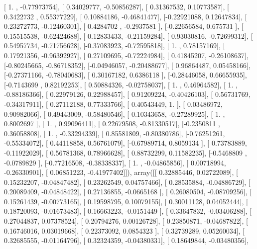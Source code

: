 \documentclass{article}
\begin{document}
       [ 1.        , -0.77973754],
       [ 0.34029777, -0.50856287],
       [ 0.31367532,  0.10773587],
       [ 0.3422732 ,  0.55377229],
       [ 0.10884186, -0.46841477],
       [-0.22921088,  0.12647834],
       [ 0.23272773, -0.12460301],
       [ 0.4284702 , -0.2937581 ],
       [-0.22656584,  0.675731  ],
       [ 0.15515538, -0.62424688],
       [ 0.12833433, -0.21159284],
       [ 0.93030816, -0.72699312],
       [ 0.54957734, -0.71756628],
       [-0.37083923, -0.72595818],
       [ 1.        ,  0.78157169],
       [ 0.17921356, -0.96392927],
       [ 0.27109695, -0.72224984],
       [ 0.41845207, -0.26108637],
       [-0.80245665, -0.86718352],
       [-0.04946057, -0.20488677],
       [ 0.96864487,  0.05458166],
       [-0.27371166, -0.78040683],
       [ 0.30167182,  0.6386118 ],
       [-0.28446058,  0.66655935],
       [-0.7143699 ,  0.82192253],
       [ 0.50884326, -0.02758037],
       [ 1.        ,  0.46964582],
       [ 1.        , -0.88186366],
       [ 0.22979126,  0.22988457],
       [ 0.91209224, -0.40426103],
       [ 0.56731769, -0.34317911],
       [ 0.27112188,  0.77333766],
       [ 0.40543449,  1.        ],
       [ 0.03486972,  0.90982066],
       [ 0.49443009, -0.58480546],
       [ 0.10343658, -0.27289925],
       [ 1.        ,  0.8002697 ],
       [ 1.        ,  0.99096411],
       [ 0.22679508, -0.81330517],
       [-0.2350811 ,  0.36058808],
       [ 1.        , -0.33294339],
       [ 0.85581809, -0.80380786],
       [-0.76251261, -0.55334072],
       [ 0.44118858,  0.56761079],
       [-0.67989714,  0.8059134 ],
       [ 0.73783889, -0.11922029],
       [ 0.56781368,  0.78966628],
       [ 0.88732299,  0.11582235],
       [-0.5468809 , -0.0789829 ],
       [-0.77216508, -0.38338337],
       [ 1.        , -0.04865856],
       [ 0.00718994, -0.26330901],
       [ 0.06851223, -0.41977402]]), array([[ 0.32885446,  0.02722089],
       [ 0.15232207, -0.04847482],
       [ 0.23262549,  0.04757466],
       [ 0.28535884, -0.04886729],
       [ 0.20089409, -0.04848422],
       [ 0.27136855, -0.0665168 ],
       [ 0.26080504, -0.08709256],
       [ 0.15261439, -0.00773165],
       [ 0.19598795,  0.10079155],
       [ 0.30011128,  0.04052444],
       [ 0.18720093, -0.01673483],
       [ 0.16663223, -0.0151449 ],
       [ 0.33647832, -0.03406288],
       [ 0.27044837,  0.07378524],
       [ 0.20794276,  0.00126728],
       [ 0.23850871, -0.04687822],
       [ 0.16746016,  0.03019668],
       [ 0.22373092,  0.0854323 ],
       [ 0.32739289,  0.05260034],
       [ 0.32685555, -0.01164796],
       [ 0.32324359, -0.04380331],
       [ 0.18649844, -0.03480356],
\end{document}
